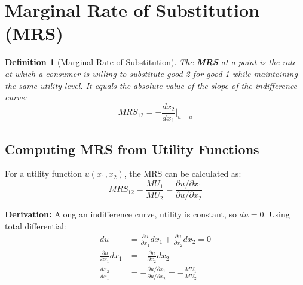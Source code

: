 \documentclass[11pt,a4paper]{article}
\newtheorem{definition}{Definition}
\begin{document}
\begin{center}
\end{center}

\section{Marginal Rate of Substitution (MRS)}

\begin{definition}[Marginal Rate of Substitution]
The \textbf{MRS} at a point is the rate at which a consumer is willing to substitute good 2 for good 1 while maintaining the same utility level. It equals the absolute value of the slope of the indifference curve:
\[
MRS_{12} = -\frac{dx_2}{dx_1}\bigg|_{u=\bar{u}}
\]
\end{definition}

\subsection{Computing MRS from Utility Functions}

For a utility function $u(x_1, x_2)$, the MRS can be calculated as:
\[
MRS_{12} = \frac{MU_1}{MU_2} = \frac{\partial u / \partial x_1}{\partial u / \partial x_2}
\]

\textbf{Derivation:} Along an indifference curve, utility is constant, so $du = 0$. Using total differential:
\begin{align*}
du &= \frac{\partial u}{\partial x_1}dx_1 + \frac{\partial u}{\partial x_2}dx_2 = 0\\
\frac{\partial u}{\partial x_1}dx_1 &= -\frac{\partial u}{\partial x_2}dx_2\\
\frac{dx_2}{dx_1} &= -\frac{\partial u / \partial x_1}{\partial u / \partial x_2} = -\frac{MU_1}{MU_2}
\end{align*}
\end{document}
